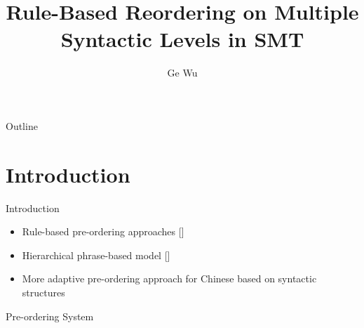 \documentclass[18pt]{beamer}
\title{Rule-Based Reordering on Multiple Syntactic Levels in SMT}
\author{Ge Wu}
\institute{Institute for Anthropomatics and Robotics (IAR)}
\begin{document}

\begin{frame}
\titlepage
\end{frame}

\begin{frame}{Outline}
\tableofcontents
\end{frame}

\section{Introduction}
\begin{frame}{Introduction}
\begin{itemize}
\item Rule-based pre-ordering approaches {\scriptsize [\cite{short, long, tree}]}
\item Hierarchical phrase-based model {\scriptsize [\cite{hier}]}
\item More adaptive pre-ordering approach for Chinese based on syntactic structures
\end{itemize}
\end{frame}

\begin{frame}{Pre-ordering System}
\begin{figure}
\centering

\end{figure}
\end{frame}
\end{document}
